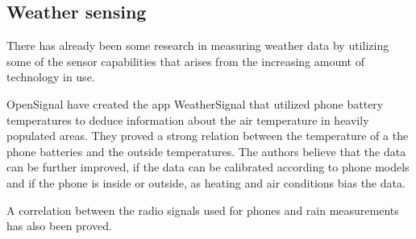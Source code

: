 \subsection{Weather sensing}
There has already been some research in measuring weather data by
utilizing some of the sensor capabilities that arises from the
increasing amount of technology in use.

OpenSignal have created the app WeatherSignal that utilized phone
battery temperatures \citep{temperatures2013} to deduce information
about the air temperature in heavily populated areas.  They proved a
strong relation between the temperature of a the phone batteries and
the outside temperatures.  The authors believe that the data can be
further improved, if the data can be calibrated according to phone
models and if the phone is inside or outside, as heating and air
conditions bias the data.

A correlation between the radio signals used for phones and rain
measurements has also been proved.

